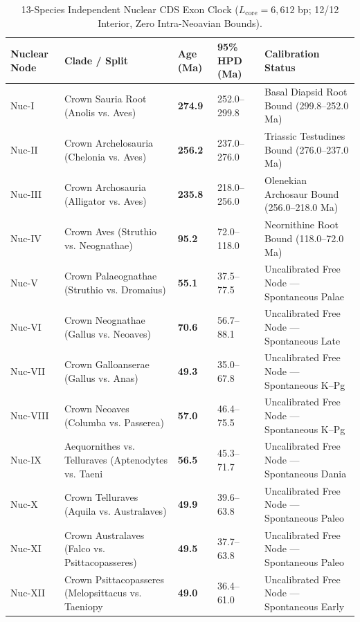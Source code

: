 \documentclass[10pt,letterpaper]{article}
\begin{document}
\begin{longtable}{lllll}
\caption{13-Species Independent Nuclear CDS Exon Clock ($L_{\mathrm{core}} = 6,612$ bp; 12/12 Interior, Zero Intra-Neoavian Bounds).} \\
\toprule
Nuclear Node & Clade / Split & Age (Ma) & 95\% HPD (Ma) & Calibration Status \\
\midrule
\endfirsthead
Nuc-I & Crown Sauria Root (Anolis vs. Aves) & \textbf{274.9} & 252.0--299.8 & Basal Diapsid Root Bound (299.8--252.0 Ma) \\
Nuc-II & Crown Archelosauria (Chelonia vs. Aves) & \textbf{256.2} & 237.0--276.0 & Triassic Testudines Bound (276.0--237.0 Ma) \\
Nuc-III & Crown Archosauria (Alligator vs. Aves) & \textbf{235.8} & 218.0--256.0 & Olenekian Archosaur Bound (256.0--218.0 Ma) \\
Nuc-IV & Crown Aves (Struthio vs. Neognathae) & \textbf{95.2} & 72.0--118.0 & Neornithine Root Bound (118.0--72.0 Ma) \\
Nuc-V & Crown Palaeognathae (Struthio vs. Dromaius) & \textbf{55.1} & 37.5--77.5 & Uncalibrated Free Node --- Spontaneous Palae \\
Nuc-VI & Crown Neognathae (Gallus vs. Neoaves) & \textbf{70.6} & 56.7--88.1 & Uncalibrated Free Node --- Spontaneous Late  \\
Nuc-VII & Crown Galloanserae (Gallus vs. Anas) & \textbf{49.3} & 35.0--67.8 & Uncalibrated Free Node --- Spontaneous K--Pg  \\
Nuc-VIII & Crown Neoaves (Columba vs. Passerea) & \textbf{57.0} & 46.4--75.5 & Uncalibrated Free Node --- Spontaneous K--Pg  \\
Nuc-IX & Aequornithes vs. Telluraves (Aptenodytes vs. Taeni & \textbf{56.5} & 45.3--71.7 & Uncalibrated Free Node --- Spontaneous Dania \\
Nuc-X & Crown Telluraves (Aquila vs. Australaves) & \textbf{49.9} & 39.6--63.8 & Uncalibrated Free Node --- Spontaneous Paleo \\
Nuc-XI & Crown Australaves (Falco vs. Psittacopasseres) & \textbf{49.5} & 37.7--63.8 & Uncalibrated Free Node --- Spontaneous Paleo \\
Nuc-XII & Crown Psittacopasseres (Melopsittacus vs. Taeniopy & \textbf{49.0} & 36.4--61.0 & Uncalibrated Free Node --- Spontaneous Early \\
\bottomrule
\end{longtable}
\end{document}
